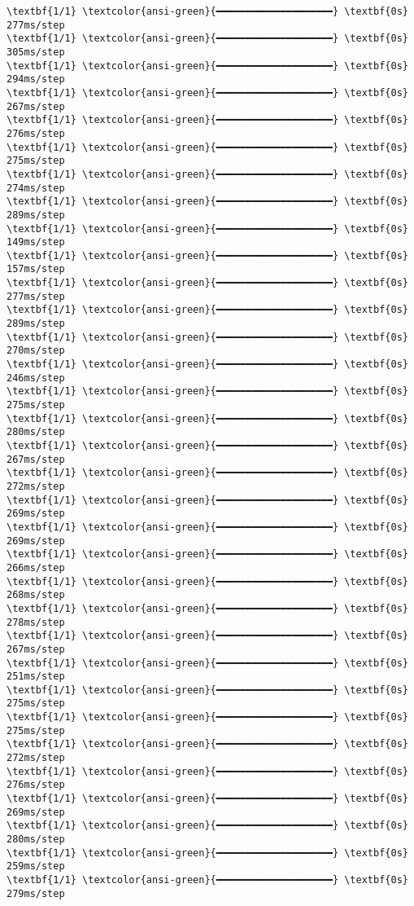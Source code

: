 \documentclass[11pt]{article}
\begin{document}
\begin{Verbatim}[commandchars=\\\{\}]
\textbf{1/1} \textcolor{ansi-green}{━━━━━━━━━━━━━━━━━━━━} \textbf{0s} 277ms/step
\textbf{1/1} \textcolor{ansi-green}{━━━━━━━━━━━━━━━━━━━━} \textbf{0s} 305ms/step
\textbf{1/1} \textcolor{ansi-green}{━━━━━━━━━━━━━━━━━━━━} \textbf{0s} 294ms/step
\textbf{1/1} \textcolor{ansi-green}{━━━━━━━━━━━━━━━━━━━━} \textbf{0s} 267ms/step
\textbf{1/1} \textcolor{ansi-green}{━━━━━━━━━━━━━━━━━━━━} \textbf{0s} 276ms/step
\textbf{1/1} \textcolor{ansi-green}{━━━━━━━━━━━━━━━━━━━━} \textbf{0s} 275ms/step
\textbf{1/1} \textcolor{ansi-green}{━━━━━━━━━━━━━━━━━━━━} \textbf{0s} 274ms/step
\textbf{1/1} \textcolor{ansi-green}{━━━━━━━━━━━━━━━━━━━━} \textbf{0s} 289ms/step
\textbf{1/1} \textcolor{ansi-green}{━━━━━━━━━━━━━━━━━━━━} \textbf{0s} 149ms/step
\textbf{1/1} \textcolor{ansi-green}{━━━━━━━━━━━━━━━━━━━━} \textbf{0s} 157ms/step
\textbf{1/1} \textcolor{ansi-green}{━━━━━━━━━━━━━━━━━━━━} \textbf{0s} 277ms/step
\textbf{1/1} \textcolor{ansi-green}{━━━━━━━━━━━━━━━━━━━━} \textbf{0s} 289ms/step
\textbf{1/1} \textcolor{ansi-green}{━━━━━━━━━━━━━━━━━━━━} \textbf{0s} 270ms/step
\textbf{1/1} \textcolor{ansi-green}{━━━━━━━━━━━━━━━━━━━━} \textbf{0s} 246ms/step
\textbf{1/1} \textcolor{ansi-green}{━━━━━━━━━━━━━━━━━━━━} \textbf{0s} 275ms/step
\textbf{1/1} \textcolor{ansi-green}{━━━━━━━━━━━━━━━━━━━━} \textbf{0s} 280ms/step
\textbf{1/1} \textcolor{ansi-green}{━━━━━━━━━━━━━━━━━━━━} \textbf{0s} 267ms/step
\textbf{1/1} \textcolor{ansi-green}{━━━━━━━━━━━━━━━━━━━━} \textbf{0s} 272ms/step
\textbf{1/1} \textcolor{ansi-green}{━━━━━━━━━━━━━━━━━━━━} \textbf{0s} 269ms/step
\textbf{1/1} \textcolor{ansi-green}{━━━━━━━━━━━━━━━━━━━━} \textbf{0s} 269ms/step
\textbf{1/1} \textcolor{ansi-green}{━━━━━━━━━━━━━━━━━━━━} \textbf{0s} 266ms/step
\textbf{1/1} \textcolor{ansi-green}{━━━━━━━━━━━━━━━━━━━━} \textbf{0s} 268ms/step
\textbf{1/1} \textcolor{ansi-green}{━━━━━━━━━━━━━━━━━━━━} \textbf{0s} 278ms/step
\textbf{1/1} \textcolor{ansi-green}{━━━━━━━━━━━━━━━━━━━━} \textbf{0s} 267ms/step
\textbf{1/1} \textcolor{ansi-green}{━━━━━━━━━━━━━━━━━━━━} \textbf{0s} 251ms/step
\textbf{1/1} \textcolor{ansi-green}{━━━━━━━━━━━━━━━━━━━━} \textbf{0s} 275ms/step
\textbf{1/1} \textcolor{ansi-green}{━━━━━━━━━━━━━━━━━━━━} \textbf{0s} 275ms/step
\textbf{1/1} \textcolor{ansi-green}{━━━━━━━━━━━━━━━━━━━━} \textbf{0s} 272ms/step
\textbf{1/1} \textcolor{ansi-green}{━━━━━━━━━━━━━━━━━━━━} \textbf{0s} 276ms/step
\textbf{1/1} \textcolor{ansi-green}{━━━━━━━━━━━━━━━━━━━━} \textbf{0s} 269ms/step
\textbf{1/1} \textcolor{ansi-green}{━━━━━━━━━━━━━━━━━━━━} \textbf{0s} 280ms/step
\textbf{1/1} \textcolor{ansi-green}{━━━━━━━━━━━━━━━━━━━━} \textbf{0s} 259ms/step
\textbf{1/1} \textcolor{ansi-green}{━━━━━━━━━━━━━━━━━━━━} \textbf{0s} 279ms/step

\end{Verbatim}
\end{document}

